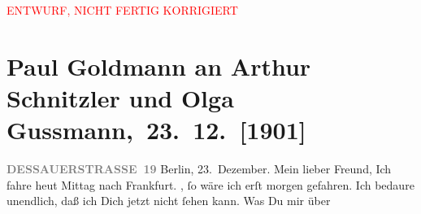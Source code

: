 
\begin{center}
            \textcolor{red}{ENTWURF, NICHT FERTIG KORRIGIERT}
                      \end{center}
            
         
         \renewcommand{\erwaehntePersonen}{Personen: Josef Rosengart, Olga Schnitzler, Heinrich Schnitzler}
         \renewcommand{\erwaehnteOrte}{Orte: Berlin, Dessauer Straße, Deutsches Theater Berlin, Frankfurt am Main, Reuterweg, Wien}
         \renewcommand{\erwaehnteWerke}{Werke: Die Frau mit dem Dolche, Die letzten Masken, Lebendige Stunden, Lebendige Stunden. Vier Einakter}
               \section[ Paul Goldmann an Arthur Schnitzler und Olga Gussmann, 23. 12. {[}1901{]}]{ Paul Goldmann an Arthur Schnitzler und Olga
               Gussmann, 23. 12. {[}1901{]}}\nopagebreak{}\rehead{ }\begin{ledgroupsized}[t]{13cm}\normalsize\beginnumbering \toendnotes[C]{\smallbreak\pagebreak[2]} 
\toendnotes[C]{\smallbreak}\pstart
           \noindent{}\raggedleft{}{\pb}\textcolor{gray}{\textbf{DESSAUERSTRASSE 19}}\pend
           \pstart
           Berlin, 23. Dezember.\pend
           \pstart\center{}Mein lieber Freund,\pend\pstart
           Ich fahre heut{ }Mittag nach Frankfurt. \label{K_L03097-1v}\label{K_L03097-1h}, ſo wäre ich erſt morgen gefahren. Ich bedaure
               unendlich, daß ich Dich jetzt nicht ſehen kann.\pend
           \pstart
           Was Du mir über \label{K_L03097-2v}
\end{ledgroupsized}
